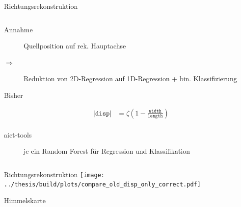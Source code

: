 \documentclass[aspectratio=1610, 9pt]{beamer}
\begin{document}
\begin{frame}[c]{Richtungsrekonstruktion}
  \begin{columns}[onlytextwidth, c]
    \begin{column}{0.475\textwidth}
      \begin{description}
        \item[Annahme] Quellposition auf rek. Hauptachse
        \item[$⇒$] Reduktion von 2D-Regression auf 1D-Regression + bin. Klassifizierung
        \item[Bisher]
          \begin{align*}
            |\mathtt{disp}| &= \zeta \left(1 - \frac{\mathtt{width}}{\mathtt{length}}\right) \\
          \end{align*}
        \item[aict-tools] je ein Random Forest für Regression und Klassifikation
      \end{description}
    \end{column}
    \begin{column}{0.475\textwidth}%
    \end{column}%
  \end{columns}
\end{frame}


\begin{frame}[t]{Richtungsrekonstruktion}
  \centering
  \texttt{[image: ../thesis/build/plots/compare\_old\_disp\_only\_correct.pdf]}
\end{frame}


\begin{frame}[c]{Himmelskarte}
  \begin{center}%
  \end{center}%
\end{frame}
\end{document}
